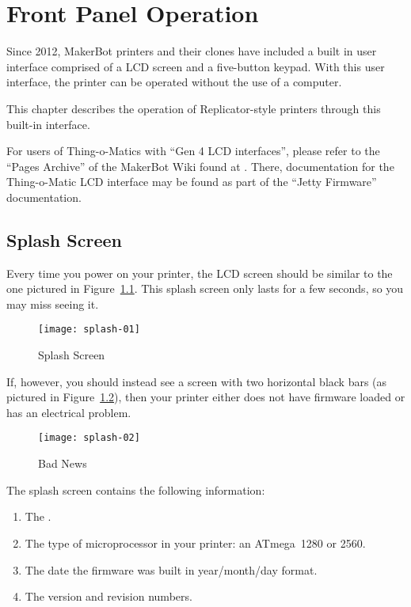 
\chapter{Front Panel Operation}\label{chap:whatever}

Since 2012, MakerBot printers and their clones have included a built in user
interface comprised of a \gls{LCD} screen and a five-button keypad.  With this
user interface, the printer can be operated without the use of a computer.

This chapter describes the operation of Replicator-style printers through this
built-in interface.

\ifdefined\luluflag
\else
For users of Thing-o-Matics with ``Gen 4 LCD interfaces'', please refer
to the ``Pages Archive'' of the MakerBot Wiki found at
.  There, documentation for the Thing-o-Matic
LCD interface may be found as part of the ``\gls{Jetty Firmware}''
documentation.
\fi


\section{Splash Screen}\label{sec:Splash}

Every time you power on your printer, the \gls{LCD} screen should be similar to the one pictured in Figure~\ref{fig:splash}.  This splash screen only lasts for a few seconds, so you may miss seeing it.

\begin{figure}[!htbp]
  \centering
    \texttt{[image: splash-01]}
    \caption{Splash Screen}
  \label{fig:splash}
\end{figure}

If, however, you should instead see a screen with two horizontal black bars (as pictured in Figure~\ref{fig:error}), then your printer either does not have \gls{firmware} loaded or has an electrical problem.

\begin{figure}[!htbp]
  \centering
    \texttt{[image: splash-02]}
    \caption{Bad News}
  \label{fig:error}
\end{figure}

The splash screen contains the following information:

\begin{enumerate}
\item The .
\item The type of microprocessor in your printer: an ATmega~1280 or 2560.
\item The date the firmware was built in year/month/day format.
\item The version and revision numbers.
\end{enumerate}

